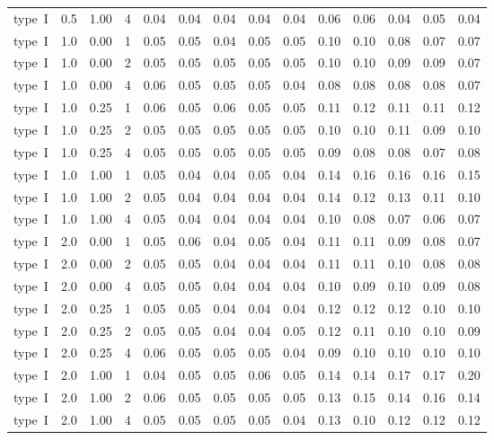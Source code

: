 \begin{table}
\begin{tabular}[t]{lrrrrrrrrrrrrr}
type~I & 0.5 & 1.00 & 4 & 0.04 & 0.04 & 0.04 & 0.04 & 0.04 & 0.06 & 0.06 & 0.04 & 0.05 & 0.04\\
type~I & 1.0 & 0.00 & 1 & 0.05 & 0.05 & 0.04 & 0.05 & 0.05 & 0.10 & 0.10 & 0.08 & 0.07 & 0.07\\
type~I & 1.0 & 0.00 & 2 & 0.05 & 0.05 & 0.05 & 0.05 & 0.05 & 0.10 & 0.10 & 0.09 & 0.09 & 0.07\\
type~I & 1.0 & 0.00 & 4 & 0.06 & 0.05 & 0.05 & 0.05 & 0.04 & 0.08 & 0.08 & 0.08 & 0.08 & 0.07\\
type~I & 1.0 & 0.25 & 1 & 0.06 & 0.05 & 0.06 & 0.05 & 0.05 & 0.11 & 0.12 & 0.11 & 0.11 & 0.12\\
type~I & 1.0 & 0.25 & 2 & 0.05 & 0.05 & 0.05 & 0.05 & 0.05 & 0.10 & 0.10 & 0.11 & 0.09 & 0.10\\
type~I & 1.0 & 0.25 & 4 & 0.05 & 0.05 & 0.05 & 0.05 & 0.05 & 0.09 & 0.08 & 0.08 & 0.07 & 0.08\\
type~I & 1.0 & 1.00 & 1 & 0.05 & 0.04 & 0.04 & 0.05 & 0.04 & 0.14 & 0.16 & 0.16 & 0.16 & 0.15\\
type~I & 1.0 & 1.00 & 2 & 0.05 & 0.04 & 0.04 & 0.04 & 0.04 & 0.14 & 0.12 & 0.13 & 0.11 & 0.10\\
type~I & 1.0 & 1.00 & 4 & 0.05 & 0.04 & 0.04 & 0.04 & 0.04 & 0.10 & 0.08 & 0.07 & 0.06 & 0.07\\
type~I & 2.0 & 0.00 & 1 & 0.05 & 0.06 & 0.04 & 0.05 & 0.04 & 0.11 & 0.11 & 0.09 & 0.08 & 0.07\\
type~I & 2.0 & 0.00 & 2 & 0.05 & 0.05 & 0.04 & 0.04 & 0.04 & 0.11 & 0.11 & 0.10 & 0.08 & 0.08\\
type~I & 2.0 & 0.00 & 4 & 0.05 & 0.05 & 0.04 & 0.04 & 0.04 & 0.10 & 0.09 & 0.10 & 0.09 & 0.08\\
type~I & 2.0 & 0.25 & 1 & 0.05 & 0.05 & 0.04 & 0.04 & 0.04 & 0.12 & 0.12 & 0.12 & 0.10 & 0.10\\
type~I & 2.0 & 0.25 & 2 & 0.05 & 0.05 & 0.04 & 0.04 & 0.05 & 0.12 & 0.11 & 0.10 & 0.10 & 0.09\\
type~I & 2.0 & 0.25 & 4 & 0.06 & 0.05 & 0.05 & 0.05 & 0.04 & 0.09 & 0.10 & 0.10 & 0.10 & 0.10\\
type~I & 2.0 & 1.00 & 1 & 0.04 & 0.05 & 0.05 & 0.06 & 0.05 & 0.14 & 0.14 & 0.17 & 0.17 & 0.20\\
type~I & 2.0 & 1.00 & 2 & 0.06 & 0.05 & 0.05 & 0.05 & 0.05 & 0.13 & 0.15 & 0.14 & 0.16 & 0.14\\
type~I & 2.0 & 1.00 & 4 & 0.05 & 0.05 & 0.05 & 0.05 & 0.04 & 0.13 & 0.10 & 0.12 & 0.12 & 0.12\\
\bottomrule
\end{tabular}
\end{table}
